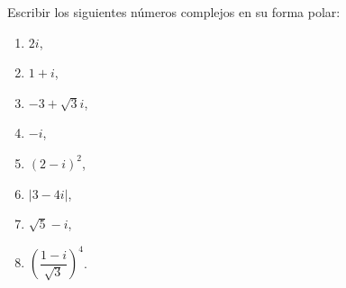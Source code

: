\documentclass[twoside]{book}
\begin{document}
\begin{example}{}
    Escribir los siguientes n\'umeros complejos en su forma polar:
    \begin{multicols}{3}
        \begin{enumerate}[label=\alph*).]
            \item $2i$,
            \item $1+i$,
            \item $-3+\sqrt{3}i$,
            \item $-i$,
            \item $(2-i)^2$,
            \item $|3-4i|$,
            \item $\sqrt{5}-i$,
            \item $\left(\dfrac{1-i}{\sqrt{3}}\right)^4$.
        \end{enumerate}
    \end{multicols}

\end{example}
\end{document}
